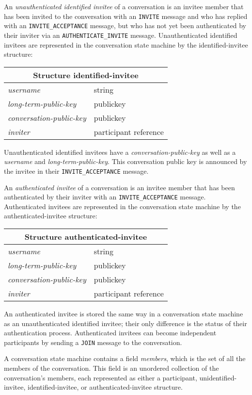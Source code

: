 \documentclass{article}
\def\npmessage#1{\texttt{#1}}
\def\smfield#1{\textsl{#1}}
\def\type#1{\textsf{#1}}
\newenvironment{struct}[1]{
\newcommand{\structfield}[2]{
\smfield{##1} & \type{##2} \\
\hline
}
\par
\vspace{-\medskipamount}
\hspace{2em minus 2em}\begin{tabular}{|l|l|}
\hline
\multicolumn{2}{|c|}{Structure \type{#1}} \\
\hline
\hline
}{
\end{tabular}
\vspace{-\medskipamount}
\par
}
\begin{document}
An \emph{unauthenticated identified invitee} of a conversation is an invitee member that has been invited to the conversation with an \npmessage{INVITE} message and who has replied with an \npmessage{INVITE\_ACCEPTANCE} message, but who has not yet been authenticated by their inviter via an \npmessage{AUTHENTICATE\_INVITE} message.
Unauthenticated identified invitees are represented in the conversation state machine by the \type{identified-invitee} structure:
\begin{struct}{identified-invitee}
\structfield{username}{string}
\structfield{long-term-public-key}{publickey}
\structfield{conversation-public-key}{publickey}
\structfield{inviter}{participant reference}
\end{struct}
Unauthenticated identified invitees have a \smfield{conversation-public-key} as well as a \smfield{username} and \smfield{long-term-public-key}.
This conversation public key is announced by the invitee in their \npmessage{INVITE\_ACCEPTANCE} message.

An \emph{authenticated invitee} of a conversation is an invitee member that has been authenticated by their inviter with an \npmessage{INVITE\_ACCEPTANCE} message.
Authenticated invitees are represented in the conversation state machine by the \type{authenticated-invitee} structure:
\begin{struct}{authenticated-invitee}
\structfield{username}{string}
\structfield{long-term-public-key}{publickey}
\structfield{conversation-public-key}{publickey}
\structfield{inviter}{participant reference}
\end{struct}
An authenticated invitee is stored the same way in a conversation state machine as an unauthenticated identified invitee; their only difference is the status of their authentication process.
Authenticated invitees can become independent participants by sending a \npmessage{JOIN} message to the conversation.


A conversation state machine contains a field \smfield{members}, which is the set of all the members of the conversation.
This field is an unordered collection of the conversation's members, each represented as either a \type{participant}, \type{unidentified-invitee}, \type{identified-invitee}, or \type{authenticated-invitee} structure.
\end{document}
